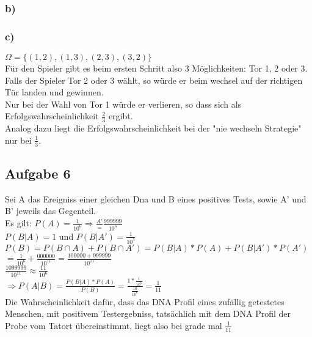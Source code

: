 \documentclass[11pt]{amsart}
\begin{document}
\subsubsection{b)}



\subsubsection{c)}

$\Omega = \{(1,2),(1,3),(2,3),(3,2)\}$ \\
Für den Spieler gibt es beim ersten Schritt also 3 Möglichkeiten: Tor 1, 2 oder 3. \\ 
Falls der Spieler Tor 2 oder 3 wählt, so würde er beim wechsel auf der richtigen Tür landen und gewinnen. \\
Nur bei der Wahl von Tor 1 würde er verlieren, so dass sich als Erfolgswahrscheinlichkeit $\frac{2}{3}$ ergibt. \\
Analog dazu liegt die Erfolgswahrscheinlichkeit bei der "nie wechseln Strategie" nur bei $\frac{1}{3}$.

\subsection{Aufgabe 6}

Sei A das Ereigniss einer gleichen Dna und B eines positives Tests, sowie A' und B' jeweils das Gegenteil.\\
Es gilt: $P(A) = \frac{1}{10^6} \Rightarrow \frac{A'} = \frac{999999}{10^6}$ \\
$P(B | A) = 1$ und $P(B | A') = \frac{1}{10^5}$ \\
$P(B) = P(B \cap A) + P(B \cap A') = P(B|A) * P(A) + P(B|A') * P(A')$ \\
$= \frac{1}{10^6} + \frac{000000}{10^{11}} = \frac{100000 + 999999}{10^{11}}$ \\
$\frac{1099999}{10^{11}} \approx \frac{11}{10^6}$ \\ 
$\Rightarrow P(A | B) = \frac{P(B|A) * P(A)}{P(B)} = \frac{1 * \frac{1}{10^6}}{\frac{10}{10^6}} = \frac{1}{11}$ \\
Die Wahrscheinlichkeit dafür, dass das DNA Profil eines zufällig getestetes Menschen, mit positivem Testergebniss, 
tatsächlich mit dem DNA Profil der Probe vom Tatort übereinstimmt, liegt also bei grade mal $\frac{1}{11}$ \\
\end{document}
